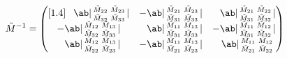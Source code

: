     \begin{equation*}
        \begin{split}
            \tilde{M}^{-1} &= 
        \begin{pmatrix}[1.4]
            \phantom{-}\ab|\begin{smallmatrix}
              \tilde{M}_{22} & \tilde{M}_{23} \\ \tilde{M}_{32} & \tilde{M}_{33}
          \end{smallmatrix}| & 
            -\ab|\begin{smallmatrix}
              \tilde{M}_{21} & \tilde{M}_{23} \\ \tilde{M}_{31} & \tilde{M}_{33}
          \end{smallmatrix}| &
          \phantom{-}\ab|\begin{smallmatrix}
              \tilde{M}_{21} & \tilde{M}_{22} \\ \tilde{M}_{31} & \tilde{M}_{32}
            \end{smallmatrix}| \\
            -\ab|\begin{smallmatrix}
              \tilde{M}_{12} & \tilde{M}_{13} \\ \tilde{M}_{32} & \tilde{M}_{33}
          \end{smallmatrix}| & 
          \phantom{-}\ab|\begin{smallmatrix}
              \tilde{M}_{11} & \tilde{M}_{13} \\ \tilde{M}_{31} & \tilde{M}_{33}
          \end{smallmatrix}| &
            -\ab|\begin{smallmatrix}
              \tilde{M}_{11} & \tilde{M}_{12} \\ \tilde{M}_{31} & \tilde{M}_{32}
            \end{smallmatrix}| \\
            \phantom{-}\ab|\begin{smallmatrix}
              \tilde{M}_{12} & \tilde{M}_{13} \\ \tilde{M}_{22} & \tilde{M}_{23}
          \end{smallmatrix}| & 
            -\ab|\begin{smallmatrix}
              \tilde{M}_{11} & \tilde{M}_{13} \\ \tilde{M}_{21} & \tilde{M}_{23}
          \end{smallmatrix}| &
          \phantom{-}\ab|\begin{smallmatrix}
              \tilde{M}_{11} & \tilde{M}_{12} \\ \tilde{M}_{21} & \tilde{M}_{22}

\end{smallmatrix}
\end{pmatrix}
\end{split}
\end{equation*}
